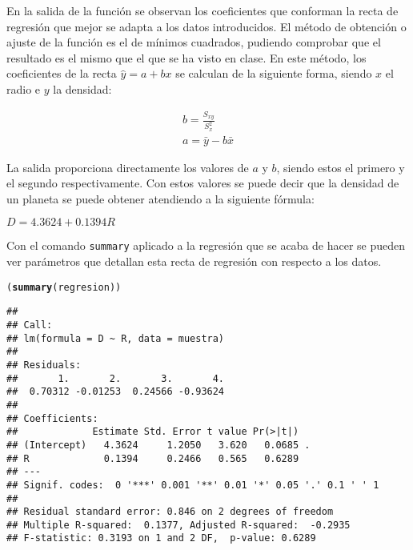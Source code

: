 \documentclass[12pt]{report}\usepackage[]{graphicx}\usepackage[dvipsnames]{xcolor}
\makeatletter
\newcommand{\hlstd}[1]{\textcolor[rgb]{0.345,0.345,0.345}{#1}}%
\newcommand{\hlkwd}[1]{\textcolor[rgb]{0.737,0.353,0.396}{\textbf{#1}}}%
\newenvironment{kframe}{%
 \def\at@end@of@kframe{}%
 \ifinner\ifhmode%
  \def\at@end@of@kframe{\end{minipage}}%
  \begin{minipage}{\columnwidth}%
 \fi\fi%
 \def\FrameCommand##1{\hskip\@totalleftmargin \hskip-\fboxsep
 \colorbox{shadecolor}{##1}\hskip-\fboxsep
     \hskip-\linewidth \hskip-\@totalleftmargin \hskip\columnwidth}%
 \MakeFramed {\advance\hsize-\width
   \@totalleftmargin\z@ \linewidth\hsize
   \@setminipage}}%
 {\par\unskip\endMakeFramed%
 \at@end@of@kframe}
\newenvironment{knitrout}{}{} %
\makeatother
\begin{document}
			En la salida de la función se observan los coeficientes que conforman la recta de regresión que mejor se adapta a los datos introducidos. El método de obtención o ajuste de la función es el de mínimos cuadrados, pudiendo comprobar que el resultado es el mismo que el que se ha visto en clase. En este método, los coeficientes de la recta $\hat{y} = a +bx$ se calculan de la siguiente forma, siendo $x$ el radio e $y$ la densidad:
			
			$$
			\begin{gathered}
				b = \frac{S_{xy}}{S^2_x}\\
				a = \bar{y}-b\bar{x}
			\end{gathered}
			$$
			 
			 La salida proporciona directamente los valores de $a$ y $b$, siendo estos el primero y el segundo respectivamente. Con estos valores se puede decir que la densidad de un planeta se puede obtener atendiendo a la siguiente fórmula:
			 
			 \begin{center}
			 	$D = 4.3624 + 0.1394R$
			 \end{center}
			 
			 Con el comando \texttt{summary} aplicado a la regresión que se acaba de hacer se pueden ver parámetros que detallan esta recta de regresión con respecto a los datos.
			 
\begin{knitrout}
\color{fgcolor}\begin{kframe}
\begin{alltt}
\hlstd{(}\hlkwd{summary}\hlstd{(regresion))}
\end{alltt}
\begin{verbatim}
## 
## Call:
## lm(formula = D ~ R, data = muestra)
## 
## Residuals:
##       1.       2.       3.       4. 
##  0.70312 -0.01253  0.24566 -0.93624 
## 
## Coefficients:
##             Estimate Std. Error t value Pr(>|t|)  
## (Intercept)   4.3624     1.2050   3.620   0.0685 .
## R             0.1394     0.2466   0.565   0.6289  
## ---
## Signif. codes:  0 '***' 0.001 '**' 0.01 '*' 0.05 '.' 0.1 ' ' 1
## 
## Residual standard error: 0.846 on 2 degrees of freedom
## Multiple R-squared:  0.1377,	Adjusted R-squared:  -0.2935 
## F-statistic: 0.3193 on 1 and 2 DF,  p-value: 0.6289
\end{verbatim}
\end{kframe}
\end{knitrout}
			 
\end{document}
